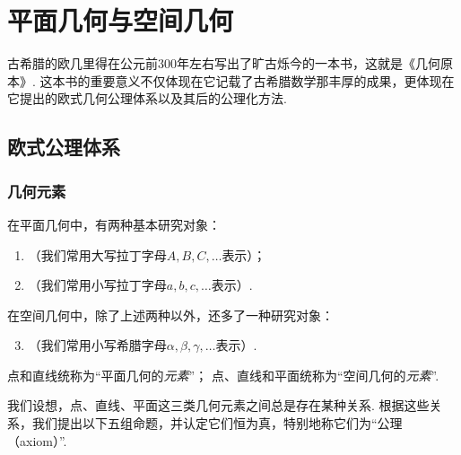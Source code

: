 \chapter{平面几何与空间几何}
古希腊的欧几里得在公元前300年左右写出了旷古烁今的一本书，这就是《几何原本》.
这本书的重要意义不仅体现在它记载了古希腊数学那丰厚的成果，更体现在它提出的欧式几何公理体系以及其后的公理化方法.

\section{欧式公理体系}
\subsection{几何元素}
\begin{definition}\label{definition:欧式几何.几何元素.基本几何元素}
在平面几何中，有两种基本研究对象：
\begin{enumerate}
\item {}（我们常用大写拉丁字母\(A,B,C,\dotsc\)表示）；
\item {}（我们常用小写拉丁字母\(a,b,c,\dotsc\)表示）.
\end{enumerate}
在空间几何中，除了上述两种以外，还多了一种研究对象：
\begin{enumerate}
\setcounter{enumi}{2}
\item {}（我们常用小写希腊字母\(\alpha,\beta,\gamma,\dotsc\)表示）.
\end{enumerate}
点和直线统称为“平面几何的\emph{元素}”；
点、直线和平面统称为“空间几何的\emph{元素}”.
\end{definition}

我们设想，点、直线、平面这三类几何元素之间总是存在某种关系.
根据这些关系，我们提出以下五组命题，并认定它们恒为真，特别地称它们为“公理（axiom）”.

